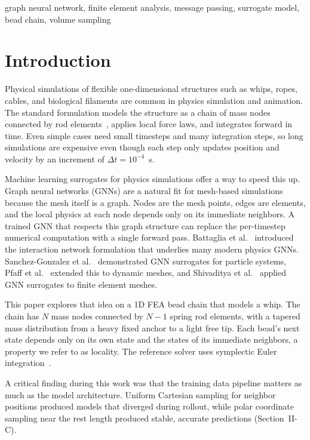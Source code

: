 \documentclass[conference]{IEEEtran}
\begin{document}
\begin{IEEEkeywords}
graph neural network, finite element analysis, message passing, surrogate model, bead chain, volume sampling
\end{IEEEkeywords}

\section{Introduction}

Physical simulations of flexible one-dimensional structures such as whips, ropes, cables, and biological filaments are common in physics simulation and animation. The standard formulation models the structure as a chain of mass nodes connected by rod elements~\cite{bathe1996finite}, applies local force laws, and integrates forward in time. Even simple cases need small timesteps and many integration steps, so long simulations are expensive even though each step only updates position and velocity by an increment of $\Delta t = 10^{-4}$~s.

Machine learning surrogates for physics simulations offer a way to speed this up. Graph neural networks (GNNs) are a natural fit for mesh-based simulations because the mesh itself is a graph. Nodes are the mesh points, edges are elements, and the local physics at each node depends only on its immediate neighbors. A trained GNN that respects this graph structure can replace the per-timestep numerical computation with a single forward pass. Battaglia et al.~\cite{battaglia2016interaction} introduced the interaction network formulation that underlies many modern physics GNNs. Sanchez-Gonzalez et al.~\cite{sanchez2020learning} demonstrated GNN surrogates for particle systems, Pfaff et al.~\cite{pfaff2020learning} extended this to dynamic meshes, and Shivaditya et al.~\cite{shivaditya2022gnn} applied GNN surrogates to finite element meshes.

This paper explores that idea on a 1D FEA bead chain that models a whip. The chain has $N$ mass nodes connected by $N-1$ spring rod elements, with a tapered mass distribution from a heavy fixed anchor to a light free tip. Each bead's next state depends only on its own state and the states of its immediate neighbors, a property we refer to as locality. The reference solver uses symplectic Euler integration~\cite{hairer2006geometric}.

A critical finding during this work was that the training data pipeline matters as much as the model architecture. Uniform Cartesian sampling for neighbor positions produced models that diverged during rollout, while polar coordinate sampling near the rest length produced stable, accurate predictions (Section~II-C).
\end{document}
